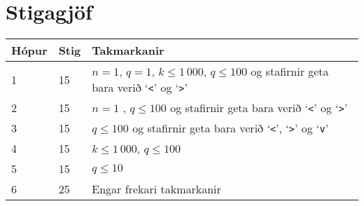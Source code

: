 \section*{Stigagjöf}
\begin{tabular}{|l|l|l|}
\hline
Hópur & Stig & Takmarkanir \\ \hline
1     & 15   & $n=1$, $q=1$, $k \leq 1\,000$, $q\leq 100$ og stafirnir geta bara verið `\texttt{<}' og `\texttt{>}' \\ \hline
2     & 15   & $n=1$ , $q\leq 100$ og stafirnir geta bara verið `\texttt{<}' og `\texttt{>}' \\ \hline
3     & 15   & $q\leq 100$ og stafirnir geta bara verið `\texttt{<}', `\texttt{>}' og `\texttt{v}' \\ \hline
4     & 15   & $k \leq 1\,000$, $q\leq 100$ \\ \hline
5     & 15   & $q\leq 10$ \\ \hline
6     & 25   & Engar frekari takmarkanir\\ \hline
\end{tabular}

